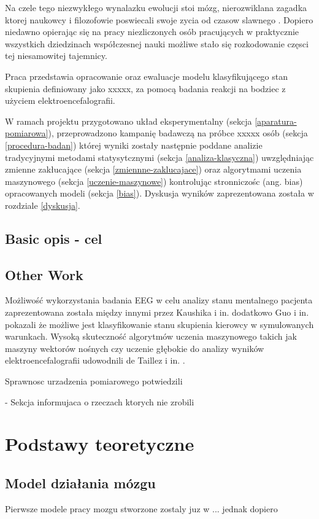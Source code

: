 \documentclass{./assets/wfis}
\begin{document}
Na czele tego niezwykłego wynalazku ewolucji stoi mózg, nierozwiklana zagadka ktorej naukowcy i filozofowie poswiecali swoje zycia od czasow slawnego  . Dopiero niedawno opierając się na pracy niezliczonych osób pracujących w praktycznie wszystkich dziedzinach współczesnej nauki możliwe stało się rozkodowanie częsci tej niesamowitej tajemnicy. 

Praca przedstawia opracowanie oraz ewaluacje modelu klasyfikującego stan skupienia definiowany jako  xxxxx, za pomocą badania reakcji na bodziec z użyciem elektroencefalografii. 

W ramach projektu przygotowano układ eksperymentalny (sekcja \ref{aparatura-pomiarowa}), przeprowadzono kampanię badawczą na próbce xxxxx osób (sekcja \ref{procedura-badan}) której wyniki zostały następnie poddane analizie tradycyjnymi metodami statysytcznymi (sekcja \ref{analiza-klasyczna}) uwzględniając zmienne zakłucające (sekcja \ref{zmiennne-zaklucajace}) oraz algorytmami uczenia maszynowego (sekcja \ref{uczenie-maszynowe}) kontrolując stronniczośc (ang. bias) opracowanych modeli (sekcja \ref{bias}). Dyskusja wyników zaprezentowana została w rozdziale \ref{dyskusja}.

\section{Basic opis - cel}
\section{Other Work}

Możliwość wykorzystania badania EEG w celu analizy stanu mentalnego pacjenta zaprezentowana została między innymi przez Kaushika i in. \cite{kaushik_decoding_2022} dodatkowo Guo i in. \cite{guo_detection_2018} pokazali że możliwe jest klasyfikowanie stanu skupienia kierowcy w symulowanych warunkach. Wysoką skuteczność algorytmów uczenia maszynowego takich jak maszyny wektorów nośnych czy uczenie głębokie do analizy wyników elektroencefalografii udowodnili de Taillez i in. \cite{de_taillez_machine_2020}.

Sprawnosc urzadzenia pomiarowego potwiedzili 

- Sekcja informujaca o rzeczach ktorych nie zrobili

\chapter{Podstawy teoretyczne}
\section{Model działania mózgu}
Pierwsze modele pracy mozgu stworzone zostaly juz w ... jednak dopiero
\end{document}

